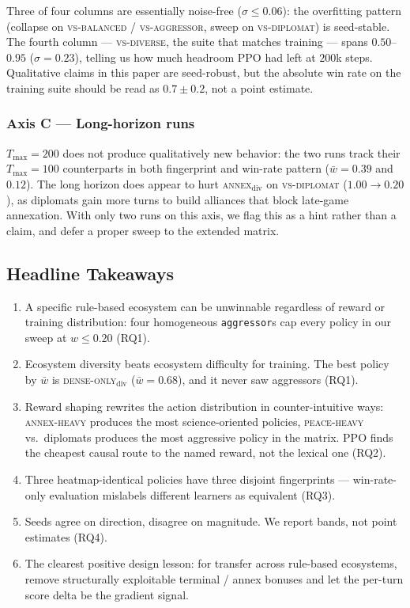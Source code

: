 Three of four columns are essentially noise-free ($\sigma{\leq}0.06$): the
overfitting pattern (collapse on \textsc{vs-balanced} / \textsc{vs-aggressor},
sweep on \textsc{vs-diplomat}) is seed-stable. The fourth column ---
\textsc{vs-diverse}, the suite that matches training --- spans
$0.50$--$0.95$ ($\sigma{=}0.23$), telling us how much headroom PPO had left
at $200$k steps. Qualitative claims in this paper are seed-robust, but the
absolute win rate on the training suite should be read as $0.7 \pm 0.2$,
not a point estimate.

\subsubsection{Axis C --- Long-horizon runs}
\label{sec:rq5}

$T_{\max}{=}200$ does not produce qualitatively new behavior: the two runs
track their $T_{\max}{=}100$ counterparts in both fingerprint and win-rate
pattern ($\bar{w}{=}0.39$ and $0.12$). The long horizon does appear to hurt
\textsc{annex}$_{\text{div}}$ on \textsc{vs-diplomat} ($1.00{\to}0.20$), as
diplomats gain more turns to build alliances that block late-game annexation.
With only two runs on this axis, we flag this as a hint rather than a claim,
and defer a proper sweep to the extended matrix.

\subsection{Headline Takeaways}
\label{sec:summary}

\begin{enumerate}
    \item A specific rule-based ecosystem can be unwinnable regardless of
          reward or training distribution: four homogeneous
          \texttt{aggressor}s cap every policy in our sweep at
          $w{\leq}0.20$ (RQ1).
    \item Ecosystem diversity beats ecosystem difficulty for training. The
          best policy by $\bar{w}$ is \textsc{dense-only}$_{\text{div}}$
          ($\bar{w}{=}0.68$), and it never saw aggressors (RQ1).
    \item Reward shaping rewrites the action distribution in counter-intuitive
          ways: \textsc{annex-heavy} produces the most science-oriented
          policies, \textsc{peace-heavy} vs.\ diplomats produces the most
          aggressive policy in the matrix. PPO finds the cheapest causal
          route to the named reward, not the lexical one (RQ2).
    \item Three heatmap-identical policies have three disjoint fingerprints
          --- win-rate-only evaluation mislabels different learners as
          equivalent (RQ3).
    \item Seeds agree on direction, disagree on magnitude. We report bands,
          not point estimates (RQ4).
    \item The clearest positive design lesson: for transfer across rule-based
          ecosystems, remove structurally exploitable terminal / annex bonuses
          and let the per-turn score delta be the gradient signal.
\end{enumerate}

